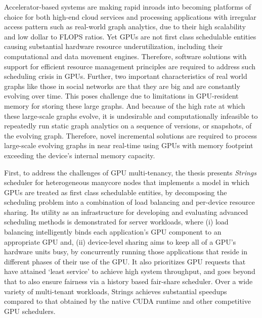 Accelerator-based systems are making rapid inroads into becoming platforms of choice for both high-end cloud services and processing applications with irregular access pattern such as real-world graph analytics, due to their high scalability and low dollar to FLOPS ratios. Yet GPUs are not first class schedulable entities causing substantial hardware resource underutilization, including their computational and data movement engines. Therefore, software solutions with support for efficient resource management principles are required to address such scheduling crisis in GPUs. Further, two important characteristics of real world graphs like those in social networks are that they are big and are constantly evolving over time. This poses challenge due to limitations in GPU-resident memory for storing these large graphs. And because of the high rate at which these large-scale graphs evolve, it is undesirable and computationally infeasible to repeatedly run static graph analytics on a sequence of versions, or snapshots, of the evolving graph. 
Therefore, novel incremental solutions are required to process large-scale evolving graphs in near real-time using GPUs with memory footprint exceeding the device's internal memory capacity. 

First, to address the challenges of GPU multi-tenancy, the thesis presents \textit{Strings} scheduler for heterogeneous manycore nodes that implements a model in which GPUs are treated as first class schedulable entities, by decomposing the scheduling problem into a combination of load balancing and per-device resource sharing. Its utility as an infrastructure for developing and evaluating advanced scheduling methods is demonstrated for server workloads, where (i) load balancing intelligently binds each application’s GPU component to an appropriate GPU and, (ii) device-level sharing aims to keep all of a GPU’s hardware units busy, by concurrently running those applications that reside in different phases of their use of the GPU. It also prioritizes GPU requests that have attained `least service' to achieve high system throughput, and goes beyond that to also ensure fairness via a history based fair-share scheduler. Over a wide variety of multi-tenant workloads, Strings achieves substantial speedups compared to that obtained by the native CUDA runtime and other competitive GPU schedulers. 

